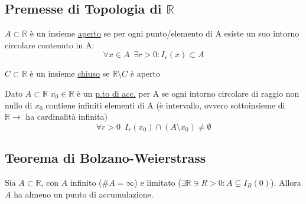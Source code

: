 \documentclass[10pt, oneside]{book}
\theoremstyle{plain}
\begin{document}
\subsection{Premesse di Topologia di \texorpdfstring{$\mathbb{R}$}{$\mathbb{R}$}}
\begin{description}
    \item[Aperto] $A \subset \mathbb{R}$ è un insieme \underline{aperto} se per ogni punto/elemento di A esiste un suo intorno circolare contenuto in A: \[\forall x \in A \enspace \exists r > 0 : I_r(x) \subset A\]
    \item[Chiuso] $C \subset \mathbb{R}$ è un insieme \underline{chiuso} se $\mathbb{R} \setminus C$ è aperto
    \hypertarget{accumulaz}{\item[Punto di accumulazione] Dato $A \subset \mathbb{R}$ $x_0 \in \mathbb{R}$ è un \underline{p.to di acc.} per A se ogni intorno circolare di raggio non nullo di $x_0$ contiene infiniti elementi di A (è intervallo, ovvero sottoinsieme di $\mathbb{R} \rightarrow$ ha cardinalità infinita) \[\forall r > 0 \enspace I_r(x_0) \cap (A \setminus {x_0}) \neq \emptyset\]}
\end{description}

\subsection{Teorema di Bolzano-Weierstrass}
\begin{ther}[\textbf{T. di B.-W.}]
Sia $A \subset \mathbb{R}$, con $A$ infinito ($\#A = \infty$) e limitato ($\exists \mathbb{R} \owns R > 0 : A \subsetneq I_R(0)$). \newline
Allora $A$ ha almeno un punto di accumulazione.
\end{ther}
\end{document}
